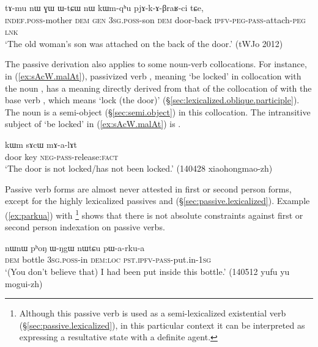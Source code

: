  \begin{exe}
\ex \label{ex:kWmqhu.pjAkABraRci}
 \gll tɤ-mu nɯ ɣɯ ɯ-tɕɯ nɯ kɯm-qʰu pjɤ-k-ɤ-βraʁ-ci tɕe,\\
 \textsc{indef}.\textsc{poss}-mother \textsc{dem} \textsc{gen} \textsc{3sg}.\textsc{poss}-son \textsc{dem} door-back \textsc{ipfv}-\textsc{peg}-\textsc{pass}-attach-\textsc{peg} \textsc{lnk} \\
\glt `The old woman's son was attached on the back of the door.' (tWJo 2012) 	
  \end{exe}

The passive derivation also applies to some noun-verb collocations. For instance, in (\ref{ex:sAcW.malAt}),  passivized verb , meaning `be locked' in collocation with the noun , has a meaning directly derived from that of the collocation of  with the base verb , which means `lock (the door)' (§\ref{sec:lexicalized.oblique.participle}). The noun  is a semi-object (§\ref{sec:semi.object}) in this collocation. The intransitive subject of  `be locked' in (\ref{ex:sAcW.malAt}) is .
 

\begin{exe}
\ex \label{ex:sAcW.malAt}
 \gll  kɯm sɤcɯ mɤ-a-lɤt \\
door key \textsc{neg}-\textsc{pass}-release:\textsc{fact} \\
\glt `The door is not locked/has not been locked.' (140428 xiaohongmao-zh) 
 \end{exe}
 
 
Passive verb forms are almost never attested in first or second person forms, except for the highly lexicalized passives  and  (§\ref{sec:passive.lexicalized}). Example (\ref{ex:parkua}) with \footnote{Although this passive verb is used as a semi-lexicalized existential verb (§\ref{sec:passive.lexicalized}), in this particular context it can be interpreted as expressing a resultative state with a definite agent. } shows that there is not absolute constraints against first or second person indexation on passive verbs. 
 
\begin{exe}
\ex \label{ex:parkua}
 \gll  nɯnɯ pʰoŋ ɯ-ŋgɯ nɯtɕu pɯ-a-rku-a \\
 \textsc{dem} bottle \textsc{3sg}.\textsc{poss}-in \textsc{dem}:\textsc{loc} \textsc{pst}.\textsc{ipfv}-\textsc{pass}-put.in-\textsc{1sg} \\
 \glt `(You don't believe that) I had been put inside this bottle.' (140512 yufu yu mogui-zh) 
\end{exe}

